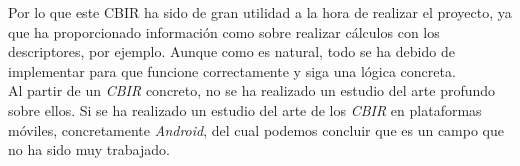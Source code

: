 Por lo que este CBIR ha sido de gran utilidad a la hora de realizar el proyecto, ya que ha proporcionado información como sobre realizar cálculos con los descriptores, por ejemplo. Aunque como es natural, todo se ha debido de implementar para que funcione correctamente y siga una lógica concreta.\\

Al partir de un \textit{CBIR} concreto, no se ha realizado un estudio del arte profundo sobre ellos. Si se ha realizado un estudio del arte de los \textit{CBIR} en plataformas móviles, concretamente \textit{Android}, del cual podemos concluir que es un campo que no ha sido muy trabajado.






